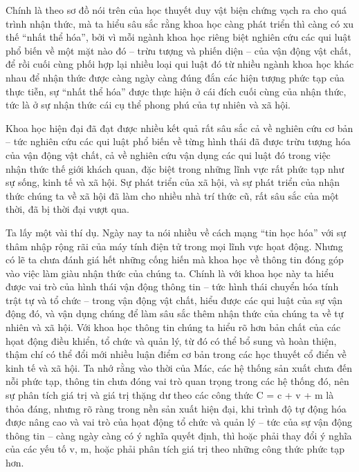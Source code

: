 Chính là theo sơ đồ nói trên của học thuyết duy vật biện chứng vạch ra cho quá trình nhận thức, mà ta hiểu sâu sắc rằng khoa học càng phát triển thì càng có xu thế “nhất thể hóa”, bởi vì mỗi ngành khoa học riêng biệt nghiên cứu các qui luật phổ biến về một mặt nào đó – trừu tượng và phiến diện – của vận động vật chất, để rồi cuối cùng phối hợp lại nhiều loại qui luật đó từ nhiều ngành khoa học khác nhau để nhận thức được càng ngày càng đúng đắn các hiện tượng phức tạp của thực tiễn, sự “nhất thể hóa” được thực hiện ở cái đích cuối cùng của nhận thức, tức là ở sự nhận thức cái cụ thể phong phú của tự nhiên và xã hội.

Khoa học hiện đại đã đạt được nhiều kết quả rất sâu sắc cả về nghiên cứu cơ bản – tức nghiên cứu các qui luật phổ biến về từng hình thái đã được trừu tượng hóa của vận động vật chất, cả về nghiên cứu vận dụng các qui luật đó trong việc nhận thức thế giới khách quan, đặc biệt trong những lĩnh vực rất phức tạp như sự sống, kinh tế và xã hội. Sự phát triển của xã hội, và sự phát triển của nhận thức chúng ta về xã hội đã làm cho nhiều nhà trí thức cũ, rất sâu sắc của một thời, đã bị thời đại vượt qua.

Ta lấy một vài thí dụ. Ngày nay ta nói nhiều về cách mạng “tin học hóa” với sự thâm nhập rộng rãi của máy tính điện tử trong mọi lĩnh vực họat động. Nhưng có lẽ ta chưa đánh giá hết những cống hiến mà khoa học về thông tin đóng góp vào việc làm giàu nhận thức của chúng ta. Chính là với khoa học này ta hiểu được vai trò của hình thái vận động thông tin – tức hình thái chuyển hóa tính trật tự và tổ chức – trong vận động vật chất, hiểu được các qui luật của sự vận động đó, và vận dụng chúng để làm sâu sắc thêm nhận thức của chúng ta về tự nhiên và xã hội. Với khoa học thông tin chúng ta hiểu rõ hơn bản chất của các họat động điều khiển, tổ chức và quản lý, từ đó có thể bổ sung và hoàn thiện, thậm chí có thể đổi mới nhiều luận điểm cơ bản trong các học thuyết cổ điển về kinh tế và xã hội. Ta nhớ rằng vào thời của Mác, các hệ thống sản xuất chưa đến nỗi phức tạp, thông tin chưa đóng vai trò quan trọng trong các hệ thống đó, nên sự phân tích giá trị và giá trị thặng dư theo các công thức C = c + v + m là thỏa đáng, nhưng rõ ràng trong nền sản xuất hiện đại, khi trình độ tự động hóa được nâng cao và vai trò của họat động tổ chức và quản lý – tức của sự vận động thông tin – càng ngày càng có ý nghĩa quyết định, thì hoặc phải thay đổi ý nghĩa của các yếu tố v, m, hoặc phải phân tích giá trị theo những công thức phức tạp hơn.

